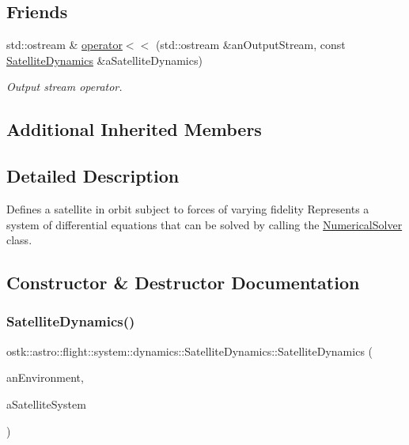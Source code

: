 \subsection*{Friends}
\begin{DoxyCompactItemize}
\item 
std\+::ostream \& \hyperlink{classostk_1_1astro_1_1flight_1_1system_1_1dynamics_1_1_satellite_dynamics_a26dfc3296b117e4887b254e5746b51bb}{operator$<$$<$} (std\+::ostream \&an\+Output\+Stream, const \hyperlink{classostk_1_1astro_1_1flight_1_1system_1_1dynamics_1_1_satellite_dynamics}{Satellite\+Dynamics} \&a\+Satellite\+Dynamics)
\begin{DoxyCompactList}\small\item\em Output stream operator. \end{DoxyCompactList}\end{DoxyCompactItemize}
\subsection*{Additional Inherited Members}


\subsection{Detailed Description}
Defines a satellite in orbit subject to forces of varying fidelity Represents a system of differential equations that can be solved by calling the \hyperlink{classostk_1_1astro_1_1_numerical_solver}{Numerical\+Solver} class. 

\subsection{Constructor \& Destructor Documentation}
\mbox{\label{classostk_1_1astro_1_1flight_1_1system_1_1dynamics_1_1_satellite_dynamics_a7bbf0ca2df46b4d1f9c2363010a2bd22}} 
\subsubsection{\texorpdfstring{Satellite\+Dynamics()}{SatelliteDynamics()}\hspace{0.1cm}{\footnotesize\ttfamily [1/2]}}
{\footnotesize\ttfamily ostk\+::astro\+::flight\+::system\+::dynamics\+::\+Satellite\+Dynamics\+::\+Satellite\+Dynamics (\begin{DoxyParamCaption}\item[{const Environment \&}]{an\+Environment,  }\item[{const \hyperlink{classostk_1_1astro_1_1flight_1_1system_1_1_satellite_system}{Satellite\+System} \&}]{a\+Satellite\+System }\end{DoxyParamCaption})}



